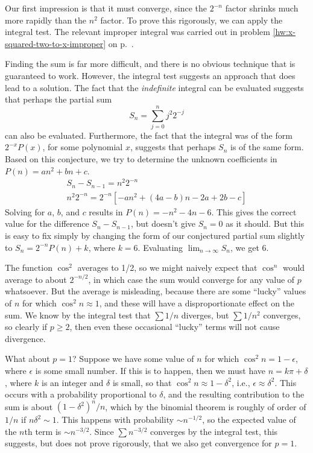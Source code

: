 Our first impression is that it must converge, since the $2^{-n}$ factor shrinks much more rapidly
than the $n^2$ factor. To prove this rigorously, we can apply the integral test. 
The relevant improper integral was carried out in problem \ref{hw:x-squared-two-to-x-improper}
on p.~\pageref{hw:x-squared-two-to-x-improper}.

Finding the sum is far more difficult, and there is no obvious technique that is guaranteed to work.
However, the integral test suggests an approach that does lead to a solution. The fact that the
\emph{indefinite} integral can be evaluated suggests that perhaps the partial sum
\begin{equation*}
  S_n = \sum_{j=0}^{n} j^2 2^{-j}
\end{equation*}
can also be evaluated. Furthermore, the fact that the integral was of the form $2^{-x}P(x)$, for some
polynomial $x$, suggests that perhaps $S_n$ is of the same form. Based on this conjecture, we
try to determine the unknown coefficients in $P(n)=an^2+bn+c$.
\begin{gather*}
  S_n-S_{n-1} = n^2 2^{-n} \\
  n^2 2^{-n} = 2^{-n}\left[-an^2+(4a-b)n-2a+2b-c\right]
\end{gather*}
Solving for $a$, $b$, and $c$ results in $P(n)=-n^2-4n-6$. This gives the correct value for the
difference $S_n-S_{n-1}$, but doesn't give $S_n=0$ as it should. But this is easy to fix simply
by changing the form of our conjectured partial sum slightly to $S_n=2^{-n}P(n)+k$, where
$k=6$. Evaluating $\lim_{n\rightarrow\infty}S_n$, we get 6.

The function $\cos^2$ averages to 1/2, so we might naively expect that $\cos^n$ would
average to about $2^{-n/2}$, in which case the sum would converge for any value of $p$ whatsoever.
But the average is misleading, because there are some ``lucky'' values of $n$ for which $\cos^2 n\approx 1$,
and these will have a disproportionate effect on the sum.
We know by the integral test that $\sum 1/n$ diverges,
but $\sum 1/n^2$ converges, so clearly if $p\ge 2$, then even these occasional ``lucky'' terms will
not cause divergence. 

What about $p=1$?
Suppose we have some value of $n$ for which
$\cos^2 n=1-\epsilon$, where $\epsilon$ is some small number. If this is to happen, then we must have
$n=k\pi+\delta$, where $k$ is an integer and $\delta$ is small, so that $\cos^2 n\approx 1-\delta^2$,
i.e., $\epsilon\approx\delta^2$. This occurs with a probability proportional to $\delta$, and the
resulting contribution to the sum is about $(1-\delta^2)^n/n$, which by the binomial theorem
is roughly of order of $1/n$ if $n\delta^2\sim1$. This happens with probability $\sim n^{-1/2}$,
so the expected value of the $n$th term is $\sim n^{-3/2}$. Since $\sum n^{-3/2}$ converges
by the integral test,
this suggests, but does not prove rigorously, that we also get convergence for $p=1$.

